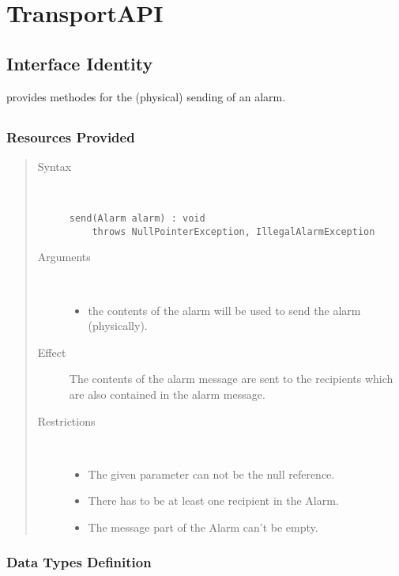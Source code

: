 \section{TransportAPI}
\label{api:notification-unit-transport-api}

\subsection{Interface Identity}

\npar {} provides methodes for the (physical) sending of
an alarm.

\subsection{}

\subsubsection{Resources Provided}

\begin{quote}
	\begin{description}
		\item[Syntax] \
		\begin{verbatim}
send(Alarm alarm) : void
    throws NullPointerException, IllegalAlarmException
		\end{verbatim}
		\item[Arguments] \
		\begin{itemize}
		  \item the contents of the alarm will be used to send the alarm (physically). 
		\end{itemize}
		\item[Effect] The contents of the alarm message are sent to the recipients
		which are also contained in the alarm message.
		\item[Restrictions] \
		\begin{itemize}
		  \item The given parameter can not be the null reference.
		  \item There has to be at least one recipient in the Alarm.
		  \item The message part of the Alarm can't be empty.
		\end{itemize}
	\end{description} 
\end{quote}

\subsubsection{Data Types Definition}

